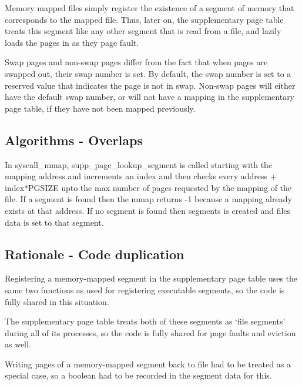 Memory mapped files simply register the existence of a segment of memory that
corresponds to the mapped file. Thus, later on, the supplementary page table treats
this segment like any other segment that is read from a file, and lazily loads
the pages in as they page fault.

Swap pages and non-swap pages differ from the fact that when pages are swapped
out, their swap number is set. By default, the swap number is set to a reserved
value that indicates the page is not in swap. Non-swap pages will either have
the default swap number, or will not have a mapping in the supplementary page
table, if they have not been mapped previously.

\subsection{Algorithms - Overlaps}


In syscall\_mmap, supp\_page\_lookup\_segment is called starting with the mapping address and increments an index and then checks every address + index*PGSIZE upto the max number of pages requested by the mapping of the file. If a segment is found then the mmap returns -1 because a mapping already exists at that address. If no segment is found then segments is created and files data is set to that segment.

\subsection{Rationale - Code duplication}


Registering a memory-mapped segment in the supplementary page table uses the
same two functions as used for registering executable segments, so the code is
fully shared in this situation.

The supplementary page table treats both of these segments as `file segments'
during all of its processes, so the code is fully shared for page faults and
eviction as well.

Writing pages of a memory-mapped segment back to file had to be treated as a
special case, so a boolean had to be recorded in the segment data for this.
